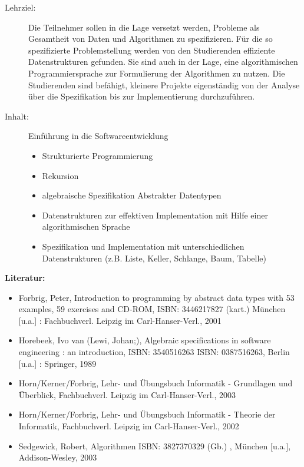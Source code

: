 \documentclass[%
a4paper, %
11pt,               %
leqno,              %
fleqn,              %
]
{scrartcl}
\begin{document}
\begin{description}
  \item[Lehrziel:] Die Teilnehmer sollen in die Lage versetzt werden, Probleme
    als Gesamtheit von Daten und Algorithmen zu spezifizieren. Für die so
    spezifizierte Problemstellung werden von den Studierenden effiziente
    Datenstrukturen gefunden. Sie sind auch in der Lage, eine algorithmischen
    Programmiersprache zur Formulierung der Algorithmen zu nutzen. Die
    Studierenden sind befähigt, kleinere Projekte eigenständig von der Analyse
    über die Spezifikation bis zur Implementierung durchzuführen.
  \item[Inhalt:] Einführung in die Softwareentwicklung
    \begin{itemize}\itemsep0pt
      \item Strukturierte Programmierung
      \item Rekursion
      \item algebraische Spezifikation Abstrakter Datentypen
      \item Datenstrukturen zur effektiven Implementation mit Hilfe einer
        algorithmischen Sprache
      \item Spezifikation und Implementation mit unterschiedlichen
        Datenstrukturen (z.B. Liste, Keller, Schlange, Baum, Tabelle)
    \end{itemize}
\end{description}
\textsf{\textbf{Literatur:}}
\begin{itemize}\itemsep0pt
  \item Forbrig, Peter, Introduction to programming by abstract data types with
    53 examples, 59 exercises and CD-ROM, ISBN: 3446217827 (kart.) München
    [u.a.] : Fachbuchverl. Leipzig im Carl-Hanser-Verl., 2001
  \item Horebeek, Ivo van (Lewi, Johan;), Algebraic specifications in software
    engineering : an introduction, ISBN: 3540516263 ISBN: 0387516263, Berlin
    [u.a.] : Springer, 1989
  \item Horn/Kerner/Forbrig, Lehr- und Übungsbuch Informatik - Grundlagen und
    Überblick, Fachbuchverl. Leipzig im Carl-Hanser-Verl., 2003
  \item Horn/Kerner/Forbrig, Lehr- und Übungsbuch Informatik - Theorie der
    Informatik, Fachbuchverl. Leipzig im Carl-Hanser-Verl., 2002
  \item Sedgewick, Robert, Algorithmen ISBN: 3827370329 (Gb.) , München [u.a.],
    Addison-Wesley, 2003
\end{itemize}
\end{document}
